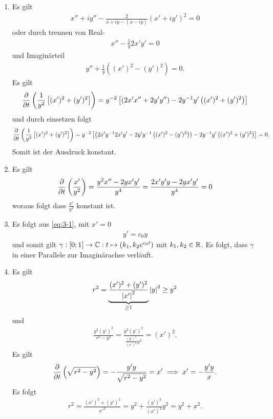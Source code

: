 \documentclass[ngerman]{report}
\begin{document}
\begin{answer}
    \begin{enumerate}
        \item Es gilt
        \begin{align*}
            x''+iy'' - \frac{2}{x+iy-(x-iy)}(x'+iy')^2 =0
        \end{align*}
        oder durch trennen von Real- 
        \begin{align*}
            x'' - \frac{1}{y} 2x'y'= 0
        \end{align*}
        und Imaginärteil
        \begin{align*}
            y'' + \frac{1}{y} \left((x')^2-(y')^2\right) = 0.
        \end{align*}
        Es gilt
        \begin{align*}
            \frac{\partial }{\partial t}\left(\frac{1}{y^2}\left[(x')^2+(y')^2\right]\right) = y^{-2}\left[\left(2x'x''+2y'y''\right)-2y^{-1}y'\left((x')^2+(y')^2\right)\right]
        \end{align*}
        und durch einsetzen folgt
        \begin{align*}
            \frac{\partial }{\partial t}\left(\frac{1}{y^2}\left[(x')^2+(y')^2\right]\right) = y^{-2}\left[\left(2x'y^{-1} 2x'y'-2y'y^{-1} \left((x')^2-(y')^2\right)\right)-2y^{-1}y'\left((x')^2+(y')^2\right)\right]=0.
        \end{align*}
        Somit ist der Ausdruck konstant.
        \item Es gilt
        \begin{align*}
            \frac{\partial }{\partial t}\left(\frac{x'}{y^2}\right) = \frac{y^2x''-2yx'y'}{y^4} = \frac{2x'y'y-2yx'y'}{y^4} = 0
        \end{align*}
        woraus folgt dass $\frac{x'}{y^2}$ konstant ist.
        \item Es folgt aus \ref{eq:3-1}, mit $x' = 0$
        \begin{align*}
            y' = c_0y
        \end{align*}
        und somit gilt $\gamma:[0;1]\to \mathbb{C}: t \mapsto (k_1,k_2e^{c_0t})$ mit $k_1,k_2\in\mathbb{R}$. Es folgt, dass $\gamma$ in einer Parallele zur Imaginärachse verläuft.
        \item Es gilt 
        \begin{align*}
            r^2 = \underbrace{\frac{(x')^2+(y')^2}{\left|x'\right|^2}}_{\geq 1}\left|y\right|^2\geq y^2
        \end{align*}
        und 
        \begin{align*}
            \frac{y^2(y')^2}{r^2-y^2} = \frac{y^2(y')^2}{\frac{(y')^2}{(x')^2}y^2} = (x')^2.
        \end{align*}
        Es gilt
        \begin{align*}
            \frac{\partial }{\partial t}\left(\sqrt{r^2-y^2}\right) = -\frac{y'y}{\sqrt{r^2-y^2}} = x'\implies x' = -\frac{y'y}{x}.
        \end{align*}
        Es folgt
        \begin{align*}
            r^2 = \frac{(x')^2+(y')^2}{x'^2} = y^2+\frac{(y')^2}{(x')^2}y^2 = y^2+x^2.
        \end{align*}
    \end{enumerate}
\end{answer}
\end{document}
